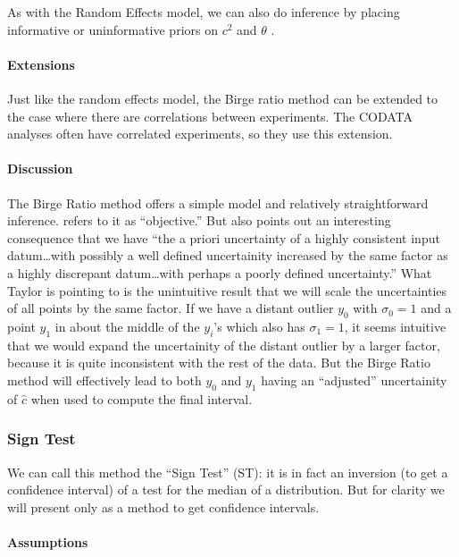 \documentclass[12pt]{article}
\begin{document}
As with the Random Effects model, we can also do inference by placing informative or uninformative priors on $c^2$ and $\theta$ \citep{bodnar2014adjustment}.

\paragraph{Extensions}\label{extensions-1}

Just like the random effects model, the Birge ratio method can be extended to the case where there are correlations between experiments. The CODATA analyses often have correlated experiments, so they use this extension.

\paragraph{Discussion}\label{discussion}

The Birge Ratio method offers a simple model and relatively straightforward inference. \citet{taylor1982numerical} refers to it as ``objective.'' But \citet{taylor1982numerical} also points out an interesting consequence that we have ``the a priori uncertainty of a highly consistent input datum\ldots with possibly a well defined uncertainity increased by the same factor as a highly discrepant datum\ldots with perhaps a poorly defined uncertainty.'' What Taylor is pointing to is the unintuitive result that we will scale the uncertainties of all points by the same factor. If we have a distant outlier $y_0$ with $\sigma_0=1$ and a point $y_1$ in about the middle of the $y_i$'s which also has $\sigma_1=1$, it seems intuitive that we would expand the uncertainity of the distant outlier by a larger factor, because it is quite inconsistent with the rest of the data. But the Birge Ratio method will effectively lead to both $y_0$ and $y_1$ having an ``adjusted'' uncertainity of $\hat c$ when used to compute the final interval.

\subsubsection{Sign Test}\label{sign-test}

We can call this method the ``Sign Test'' (ST): it is in fact an inversion (to get a confidence interval) of a test for the median of a distribution. But for clarity we will present only as a method to get confidence intervals.

\paragraph{Assumptions}\label{assumptions-3}
\end{document}
